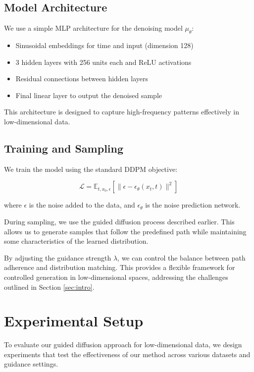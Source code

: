 \documentclass{article} %
\begin{document}
\subsection{Model Architecture}

We use a simple MLP architecture for the denoising model $\mu_\theta$:

\begin{itemize}
    \item Sinusoidal embeddings for time and input (dimension 128)
    \item 3 hidden layers with 256 units each and ReLU activations
    \item Residual connections between hidden layers
    \item Final linear layer to output the denoised sample
\end{itemize}

This architecture is designed to capture high-frequency patterns effectively in low-dimensional data.

\subsection{Training and Sampling}

We train the model using the standard DDPM objective:

\begin{equation}
    \mathcal{L} = \mathbb{E}_{t,x_0,\epsilon}[\|\epsilon - \epsilon_\theta(x_t, t)\|^2]
\end{equation}

where $\epsilon$ is the noise added to the data, and $\epsilon_\theta$ is the noise prediction network.

During sampling, we use the guided diffusion process described earlier. This allows us to generate samples that follow the predefined path while maintaining some characteristics of the learned distribution.

By adjusting the guidance strength $\lambda$, we can control the balance between path adherence and distribution matching. This provides a flexible framework for controlled generation in low-dimensional spaces, addressing the challenges outlined in Section \ref{sec:intro}.

\section{Experimental Setup}
\label{sec:experimental}

To evaluate our guided diffusion approach for low-dimensional data, we design experiments that test the effectiveness of our method across various datasets and guidance settings.
\end{document}
